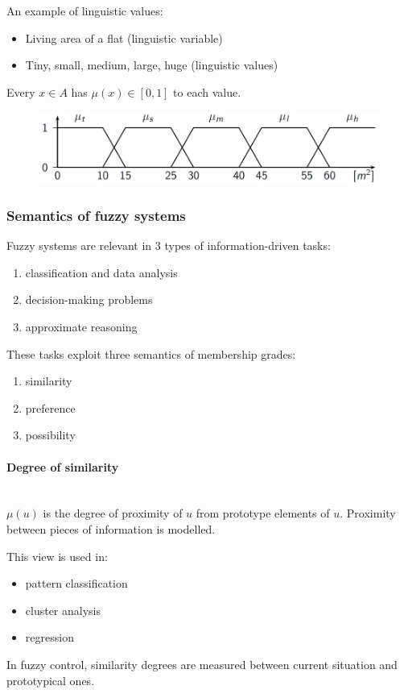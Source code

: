 \documentclass{article}
\begin{document}
An example of linguistic values:
\begin{itemize}
    \item Living area of a flat (linguistic variable)
    \item Tiny, small, medium, large, huge (linguistic values)
\end{itemize}
Every $x\in A$ has $\mu(x)\in [0,1]$ to each value.
\begin{figure}
    \centering
    \includegraphics[scale=0.4]{images/ling_val.png}
\end{figure}
\subsubsection{Semantics of fuzzy systems}
Fuzzy systems are relevant in $3$ types of information-driven
tasks:
\begin{enumerate}
    \item classification and data analysis
    \item decision-making problems
    \item approximate reasoning
\end{enumerate}
These tasks exploit three semantics of membership grades:
\begin{enumerate}
    \item similarity
    \item preference
    \item possibility
\end{enumerate}
\paragraph{Degree of similarity}\mbox{}\\
$\mu(u)$ is the degree of proximity of $u$ from prototype elements of $u$. Proximity between
pieces of information is modelled.

This view is used in:
\begin{itemize}
    \item pattern classification
    \item cluster analysis
    \item regression
\end{itemize}
In fuzzy control, similarity degrees are measured between current situation and prototypical
ones.
\end{document}
